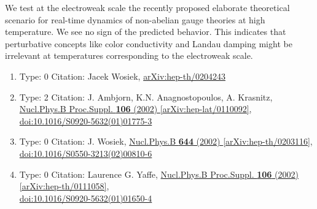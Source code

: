 \documentclass[a4paper,10pt]{article}
\begin{document}
\begin{enumerate}
We test at the electroweak scale the recently proposed elaborate theoretical scenario for real-time dynamics of non-abelian gauge theories at high temperature. We see no sign of the predicted behavior. This indicates that perturbative concepts like color conductivity and Landau damping might be irrelevant at temperatures corresponding to the electroweak scale.
\begin{enumerate}
  \item Type: 0 Citation: Jacek Wosiek, \href{https://arxiv.org/abs/hep-th/0204243}{arXiv:hep-th/0204243}
  \item Type: 2 Citation: J. Ambjorn, K.N. Anagnostopoulos, A. Krasnitz, \href{https://www.doi.org/10.1016/S0920-5632(01)01775-3}{Nucl.Phys.B Proc.Suppl. {\bf 106} (2002) }  \href{https://arxiv.org/abs/hep-lat/0110092}{[arXiv:hep-lat/0110092]},\\\href{https://www.doi.org/10.1016/S0920-5632(01)01775-3}{doi:10.1016/S0920-5632(01)01775-3}
  \item Type: 0 Citation: J. Wosiek, \href{https://www.doi.org/10.1016/S0550-3213(02)00810-6}{Nucl.Phys.B {\bf 644} (2002) }  \href{https://arxiv.org/abs/hep-th/0203116}{[arXiv:hep-th/0203116]},\\\href{https://www.doi.org/10.1016/S0550-3213(02)00810-6}{doi:10.1016/S0550-3213(02)00810-6}
  \item Type: 0 Citation: Laurence G. Yaffe, \href{https://www.doi.org/10.1016/S0920-5632(01)01650-4}{Nucl.Phys.B Proc.Suppl. {\bf 106} (2002) }  \href{https://arxiv.org/abs/hep-th/0111058}{[arXiv:hep-th/0111058]},\\\href{https://www.doi.org/10.1016/S0920-5632(01)01650-4}{doi:10.1016/S0920-5632(01)01650-4}

\end{enumerate}
\end{enumerate}
\end{document}
